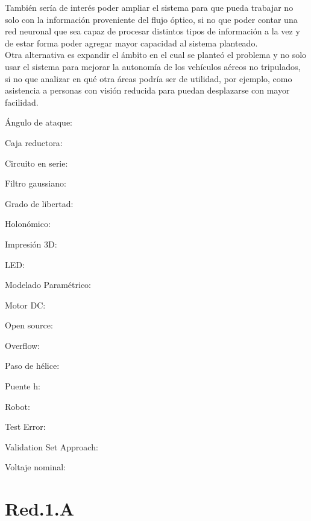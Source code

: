 \documentclass{iccmemoria}
\begin{document}
También sería de interés poder ampliar el sistema para que pueda trabajar no solo con la información proveniente del flujo óptico, si no que poder contar una red neuronal que sea capaz de procesar distintos tipos de información a la vez y de estar forma poder agregar mayor capacidad al sistema planteado.\\

Otra alternativa es expandir el ámbito en el cual se planteó el problema y no solo usar el sistema para mejorar la autonomía de los vehículos aéreos no tripulados, si no que analizar en qué otra áreas podría ser de utilidad, por ejemplo, como asistencia a personas con visión reducida para puedan desplazarse con mayor facilidad.\\

\begin{glosario}
	\item[Ángulo de ataque:]
	\item[Caja reductora:]
	\item[Circuito en serie:]
	\item[Filtro gaussiano:]
	\item[Grado de libertad:]
	\item[Holonómico:]
	\item[Impresión 3D:]
	\item[LED:]
	\item[Modelado Paramétrico:]
	\item[Motor DC:]
	\item[Open source:]
	\item[Overflow:]
	\item[Paso de hélice:]
	\item[Puente h:]
	\item[Robot:]
	\item[Test Error:]
	\item[Validation Set Approach:]
	\item[Voltaje nominal:]
\end{glosario}





\appendixpart

\label{appendix:entrenamiento red}

\section{Red.1.A}
\end{document}
